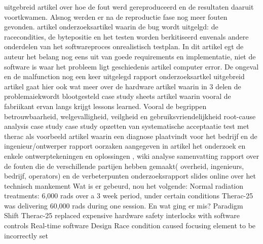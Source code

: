 uitgebreid artikel over hoe de fout werd gereproduceerd en de resultaten daaruit voortkwamen. Alsnog werden er na de reproductie fase nog meer fouten gevonden.
\cite{fabio26102015therac25}
artikel
\cite{ethicsunwrappedTherac25}
onderzoeksartikel waarin de bug wordt uitgelgd: de racecondities, de bytepositie en het testen worden berkitiseerd envenals andere onderdelen van het softwareproces
onrealistisch testplan. In dit artikel egt de auteur het belang nog eens uit van goede requirements en implementatie, niet de software is waar het probleem ligt
geschiedenis
\cite{casesHistoryTherac25}
artikel
\cite{caballero2019Therac25}
computer error. De ongeval en de malfunction nog een keer uitgelegd
\cite{rose1994theracFatalDose}
rapport
\cite{levesonMITTherac25}
\cite{grant1978theracevaluation}
onderzoeksartkel
\cite{turnerTheracAccidentsInvestigations}
\cite{turner1993TheracAccidentsInvestigations}
uitgebreid artikel gaat hier ook wat meer over de hardware
\cite{wang2017industrialdesignengineering}
artikel waarin in 3 delen de problemaiekwordt blootgesteld
\cite{levesonturner1993theracpart2}
case study sheets
artikel waarin vooral de fabriikant ervan langs krijgt
\cite{porelloTheraccFailure}
lessons learned. Vooral de begrippen betrouwbaarheid, welgevalligheid, veilgheid en gebruiksvriendelijkheid
\cite{theracIncidents}
root-cause analysis
case study
\cite{huffbrown2004casestudyethicatherac}
case study
\cite{sebowikimedicalradiation}
opzetten van systematische acceptaatie test met therac als voorbeeld
\cite{hsia1995testtherac25}
artikel waarin een diagnose plaatvindt voor het bedrijf en de ingenieur/ontwerper
\cite{magsilvaTheracTesting}
rapport
oorzaken aangegeven in artikel
\cite{chemeuropetherac25}
het onderzoek en enkele ontwerptekeningen en oplossingen
\cite{statsenko10102016Therackillerbug}
\cite{therac25casestudy}
\cite{thomas1994theracinLotos},
\cite{twitter2019programmerbehindtherac}
wiki
\cite{wikibookstherac}
analyse
\cite{bozdagTherac25}
samenvatting
\cite{levesonTurnerTheracAbstract}
rapport over de fouten die de verschillende partijen hebben gemaakt( overheid, ingenieurs, bedrijf, operators) en de verbeterpunten
onderzoeksrapport
slides online over het technisch mankement
Wat is er gebeurd, nou het volgende:
Normal radiation treatments: 6,000 rads over a 3 week period, under certain conditions Therac-25 was delivering 60,000 rads during one session.
En wat ging er mis?
Paradigm Shift
Therac-25 replaced expensive hardware safety interlocks with software controls
Real-time software
Design
Race condition caused focusing element to be incorrectly set
